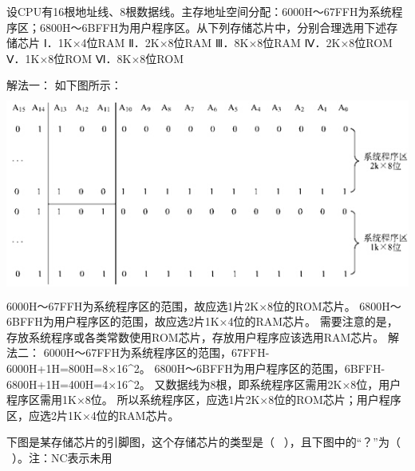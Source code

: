 \question 设CPU有16根地址线、8根数据线。主存地址空间分配：6000H～67FFH为系统程序区；6800H～6BFFH为用户程序区。从下列存储芯片中，分别合理选用下述存储芯片
Ⅰ．1K×4位RAM Ⅱ．2K×8位RAM Ⅲ．8K×8位RAM Ⅳ．2K×8位ROM Ⅴ．1K×8位ROM
Ⅵ．8K×8位ROM
\par{}
\begin{solution}解法一： 如下图所示：
\includegraphics[width=5.67708in,height=2.62500in]{computerassets/bd12baddaa6720a3d704b4d11c38d257.jpeg}
6000H～67FFH为系统程序区的范围，故应选1片2K×8位的ROM芯片。
6800H～6BFFH为用户程序区的范围，故应选2片1K×4位的RAM芯片。
需要注意的是，存放系统程序或各类常数使用ROM芯片，存放用户程序应该选用RAM芯片。
解法二： 6000H～67FFH为系统程序区的范围，67FFH-6000H+1H=800H=8×16\^{}2。
6800H～6BFFH为用户程序区的范围，6BFFH-6800H+1H=400H=4×16\^{}2。
又数据线为8根，即系统程序区需用2K×8位，用户程序区需用1K×8位。
所以系统程序区，应选1片2K×8位的ROM芯片；用户程序区，应选2片1K×4位的RAM芯片。
\end{solution}
\question 下图是某存储芯片的引脚图，这个存储芯片的类型是（
~），且下图中的``？''为（ ~）。注：NC表示未用

